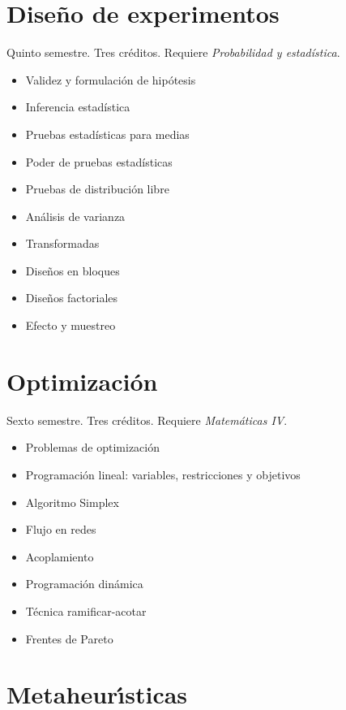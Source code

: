 \documentclass{article}
\begin{document}
\begin{multicols}{4}
\vfill\null \columnbreak

\hypertarget{dde}{\section*{Dise\~{n}o de experimentos}}

Quinto semestre. Tres cr\'{e}ditos. Requiere {\em Probabilidad y estad\'{i}stica}.

\begin{itemize}
\item{Validez y formulaci\'{o}n de hip\'{o}tesis}
\item{Inferencia estad\'{i}stica}
\item{Pruebas estad\'{i}sticas para medias}
\item{Poder de pruebas estad\'{i}sticas}
\item{Pruebas de distribuci\'{o}n libre}
\item{An\'{a}lisis de varianza}
\item{Transformadas}
\item{Dise\~{n}os en bloques}
\item{Dise\~{n}os factoriales}
\item{Efecto y muestreo}
\end{itemize}

\vfill\null \columnbreak

\hypertarget{o}{\section*{Optimizaci\'{o}n}}  

Sexto semestre. Tres cr\'{e}ditos. Requiere {\em Matem\'{a}ticas IV}.

\begin{itemize}
\item{Problemas de optimizaci\'{o}n}
\item{Programaci\'{o}n lineal: variables, restricciones y objetivos}
\item{Algoritmo Simplex}
\item{Flujo en redes}
\item{Acoplamiento}
\item{Programaci\'{o}n din\'{a}mica}
\item{T\'{e}cnica ramificar-acotar}
\item{Frentes de Pareto}
\end{itemize}

\vfill\null \columnbreak

\hypertarget{mh}{\section*{Metaheur\'{\i}sticas}} 


\end{multicols}
\end{document}
